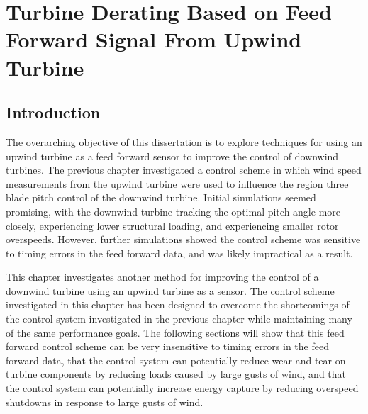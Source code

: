 
\chapter{Turbine Derating Based on Feed Forward Signal From Upwind Turbine} %

\label{Chapter4} %



\section{Introduction} \label{section4-1}

The overarching objective of this dissertation is to explore techniques for using an upwind turbine as a feed forward sensor to improve the control of downwind turbines. The previous chapter investigated a control scheme in which wind speed measurements from the upwind turbine were used to influence the region three blade pitch control of the downwind turbine. Initial simulations seemed promising, with the downwind turbine tracking the optimal pitch angle more closely, experiencing lower structural loading, and experiencing smaller rotor overspeeds. However, further simulations showed the control scheme was sensitive to timing errors in the feed forward data, and was likely impractical as a result. 

This chapter investigates another method for improving the control of a downwind turbine using an upwind turbine as a sensor. The control scheme investigated in this chapter has been designed to overcome the shortcomings of the control system investigated in the previous chapter while maintaining many of the same performance goals. The following sections will show that this feed forward control scheme can be very insensitive to timing errors in the feed forward data, that the control system can potentially reduce wear and tear on turbine components by reducing loads caused by large gusts of wind, and that the control system can potentially increase energy capture by reducing overspeed shutdowns in response to large gusts of wind.

